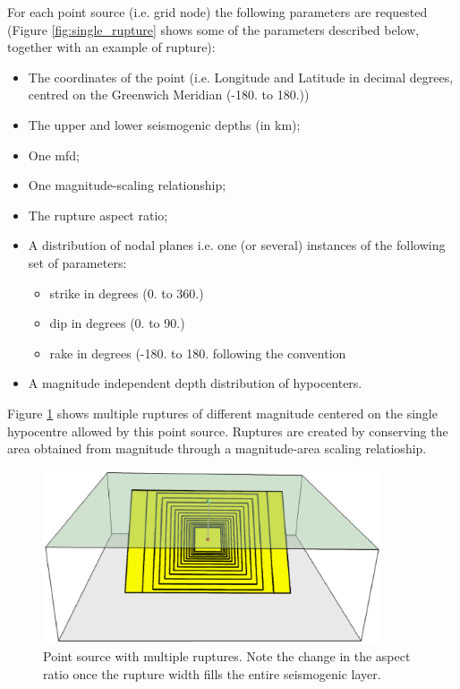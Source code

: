 %
%
For each point source (i.e. grid node) the following parameters are requested
(Figure \ref{fig:single_rupture} shows some of the parameters described below, 
together with an example of rupture):
\begin{itemize}
\item The coordinates of the point (i.e. Longitude and Latitude in decimal 
    degrees, centred on the Greenwich Meridian (-180. to 180.))
\item The upper and lower seismogenic depths (in km);
\item One \gls{mfd};
\item One magnitude-scaling relationship;
\item The rupture aspect ratio;
\item A distribution of nodal planes i.e. one (or several) instances 
    of the following set of parameters:
\begin{itemize}
    \item \gls{strike} in degrees (0. to 360.)
    \item \gls{dip} in degrees (0. to 90.)
    \item \gls{rake} in degrees (-180. to 180. following the \cite{aki2002} convention
\end{itemize}
\item A magnitude independent depth distribution of hypocenters. 
\end{itemize}
%
Figure \ref{fig:point_source_multiple_ruptures} shows multiple ruptures 
of different magnitude centered on the single hypocentre allowed 
by this point source. Ruptures are created by conserving the area obtained
from magnitude through a magnitude-area scaling relatioship.
\begin{figure}[ht!]
\centering
\includegraphics[width=10cm]{./figures/hazard/point_source_multiple_ruptures.ps}
\caption{Point source with multiple ruptures. Note the change in the aspect 
ratio once the rupture width fills the entire seismogenic layer.}
\label{fig:point_source_multiple_ruptures}
\end{figure}
